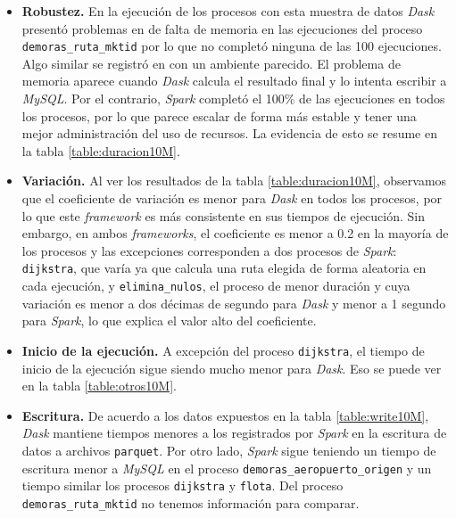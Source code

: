 \begin{itemize}

	\item \textbf{Robustez.} En la ejecución de los procesos con esta muestra de datos \textit{Dask} presentó problemas en de falta de memoria en las ejecuciones del proceso \texttt{demoras\_ruta\_mktid} por lo que no completó ninguna de las 100 ejecuciones. Algo similar se registró en \cite{comparative-evolution} con un ambiente parecido. El problema de memoria aparece cuando \textit{Dask} calcula el resultado final y lo intenta escribir a \textit{MySQL}. Por el contrario, \textit{Spark} completó el 100\% de las ejecuciones en todos los procesos, por lo que parece escalar de forma más estable y tener una mejor administración del uso de recursos. La evidencia de esto se resume en la tabla \ref{table:duracion10M}.
	
	\item \textbf{Variación.} Al ver los resultados de la tabla \ref{table:duracion10M}, observamos que el coeficiente de variación es menor para \textit{Dask} en todos los procesos, por lo que este \textit{framework} es más consistente en sus tiempos de ejecución. Sin embargo, en ambos \textit{frameworks}, el coeficiente es menor a 0.2 en la mayoría de los procesos y las excepciones corresponden a dos procesos de \textit{Spark}: \texttt{dijkstra}, que varía ya que calcula una ruta elegida de forma aleatoria en cada ejecución, y \texttt{elimina\_nulos}, el proceso de menor duración y cuya variación es menor a dos décimas de segundo para \textit{Dask} y menor a 1 segundo para \textit{Spark}, lo que explica el valor alto del coeficiente.
	
	\item \textbf{Inicio de la ejecución.} A excepción del proceso \texttt{dijkstra}, el tiempo de inicio de la ejecución sigue siendo mucho menor para \textit{Dask}. Eso se puede ver en la tabla \ref{table:otros10M}.
	
	\item \textbf{Escritura.} De acuerdo a los datos expuestos en la tabla \ref{table:write10M}, \textit{Dask} mantiene tiempos menores a los registrados por \textit{Spark} en la escritura de datos a archivos \texttt{parquet}. Por otro lado, \textit{Spark} sigue teniendo un tiempo de escritura menor a \textit{MySQL} en el proceso \texttt{demoras\_aeropuerto\_origen} y un tiempo similar los procesos \texttt{dijkstra} y \texttt{flota}. Del proceso \texttt{demoras\_ruta\_mktid} no tenemos información para comparar. 
	

\end{itemize}
